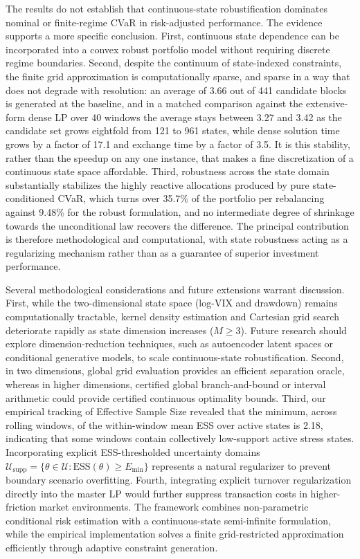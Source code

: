 \documentclass[smallcondensed]{svjour3}
\begin{document}
The results do not establish that continuous-state robustification dominates nominal or finite-regime CVaR in risk-adjusted performance. The evidence supports a more specific conclusion. First, continuous state dependence can be incorporated into a convex robust portfolio model without requiring discrete regime boundaries. Second, despite the continuum of state-indexed constraints, the finite grid approximation is computationally sparse, and sparse in a way that does not degrade with resolution: an average of 3.66 out of 441 candidate blocks is generated at the baseline, and in a matched comparison against the extensive-form dense LP over 40 windows the average stays between 3.27 and 3.42 as the candidate set grows eightfold from 121 to 961 states, while dense solution time grows by a factor of 17.1 and exchange time by a factor of 3.5. It is this stability, rather than the speedup on any one instance, that makes a fine discretization of a continuous state space affordable. Third, robustness across the state domain substantially stabilizes the highly reactive allocations produced by pure state-conditioned CVaR, which turns over 35.7\% of the portfolio per rebalancing against 9.48\% for the robust formulation, and no intermediate degree of shrinkage towards the unconditional law recovers the difference. The principal contribution is therefore methodological and computational, with state robustness acting as a regularizing mechanism rather than as a guarantee of superior investment performance.

Several methodological considerations and future extensions warrant discussion. First, while the two-dimensional state space (log-VIX and drawdown) remains computationally tractable, kernel density estimation and Cartesian grid search deteriorate rapidly as state dimension increases ($M \ge 3$). Future research should explore dimension-reduction techniques, such as autoencoder latent spaces or conditional generative models, to scale continuous-state robustification. Second, in two dimensions, global grid evaluation provides an efficient separation oracle, whereas in higher dimensions, certified global branch-and-bound or interval arithmetic could provide certified continuous optimality bounds. Third, our empirical tracking of Effective Sample Size revealed that the minimum, across rolling windows, of the within-window mean ESS over active states is 2.18, indicating that some windows contain collectively low-support active stress states. Incorporating explicit ESS-thresholded uncertainty domains $\mathcal{U}_{\text{supp}} = \{\theta \in \mathcal{U} : \text{ESS}(\theta) \ge E_{\min}\}$ represents a natural regularizer to prevent boundary scenario overfitting. Fourth, integrating explicit turnover regularization directly into the master LP would further suppress transaction costs in higher-friction market environments. The framework combines non-parametric conditional risk estimation with a continuous-state semi-infinite formulation, while the empirical implementation solves a finite grid-restricted approximation efficiently through adaptive constraint generation.
\end{document}
